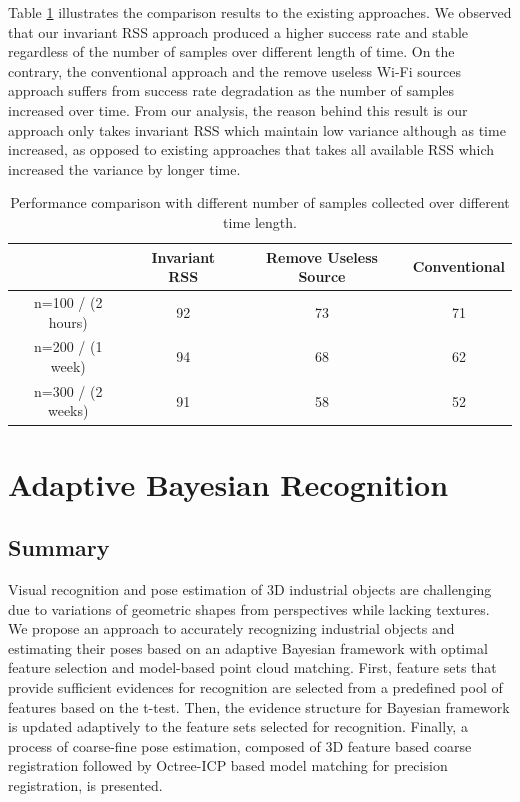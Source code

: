 \documentclass{ieeeaccess}
\begin{document}
Table \ref{wifi_table} illustrates the comparison results to the existing
approaches. We observed that our invariant RSS approach
produced a higher success rate and stable regardless of the number
of samples over different length of time. On the contrary, the
conventional approach and the remove useless Wi-Fi sources
approach suffers from success rate degradation as the number
of samples increased over time. From our analysis, the reason
behind this result is our approach only takes invariant RSS which
maintain low variance although as time increased, as opposed to
existing approaches that takes all available RSS which increased
the variance by longer time.

\begin{table}
\label{wifi_table}
\setlength{\tabcolsep}{3pt}
\centering
\begin{tabular}{c | c c c}
\hline
 & Invariant RSS & Remove Useless Source & Conventional \\
\hline
 n=100 / (2 hours) & 92 & 73 & 71 \\
 n=200 / (1 week) & 94 & 68 & 62 \\
 n=300 / (2 weeks) & 91 & 58 & 52 \\
\hline
\end{tabular}
\caption{Performance comparison with different number of
samples collected over different time length.}
\end{table}

\section{Adaptive Bayesian Recognition}
\subsection{Summary}
Visual recognition and pose estimation of 3D
industrial objects are challenging due to variations of geometric
shapes from perspectives while lacking textures. We propose an approach\cite{7750717} to accurately recognizing industrial
objects and estimating their poses based on an adaptive
Bayesian framework with optimal feature selection and
model-based point cloud matching. First, feature sets that
provide sufficient evidences for recognition are selected from a
predefined pool of features based on the t-test. Then, the
evidence structure for Bayesian framework is updated
adaptively to the feature sets selected for recognition. Finally, a
process of coarse-fine pose estimation, composed of 3D feature
based coarse registration followed by Octree-ICP based model
matching for precision registration, is presented.
\end{document}
